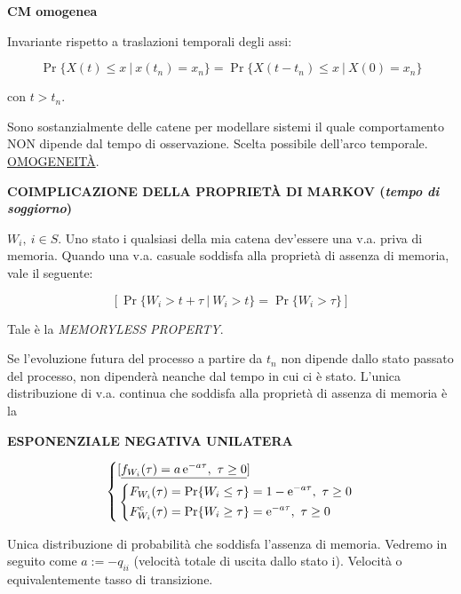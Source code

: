 \begin{defn}{\textbf{CM omogenea}}

Invariante rispetto a traslazioni temporali degli assi:

\[
	\Pr\{X(t) \leq x\ |\ x(t_n) = x_n\} = \Pr\{X(t-t_n) \leq x\ |\ X(0) = x_n\}
\]

con $t > t_n$.
\end{defn}

Sono sostanzialmente delle catene per modellare sistemi il quale comportamento NON dipende dal tempo di osservazione. Scelta possibile dell'arco temporale. \underline{OMOGENEIT\`A}.

\begin{defn}{\textbf{COIMPLICAZIONE DELLA PROPRIET\`A DI MARKOV (\textit{tempo di soggiorno})}}

$W_i,\ i\in S$. Uno stato i qualsiasi della mia catena dev'essere una v.a. priva di memoria. Quando una v.a. casuale soddisfa alla proprietà di assenza di memoria, vale il seguente:

\[
	[\Pr\{W_i > t+\tau\ |\ W_i > t\} = \Pr\{W_i > \tau\}]
\]

Tale è la \textit{MEMORYLESS PROPERTY}.
\end{defn}

Se l'evoluzione futura del processo a partire da $t_n$ non dipende dallo stato passato del processo, non dipenderà neanche dal tempo in cui ci è stato. L'unica distribuzione di v.a. continua che soddisfa alla proprietà di assenza di memoria è la

\begin{defn}{\textbf{ESPONENZIALE NEGATIVA UNILATERA}}

\[
	\left\{
	\begin{aligned}
	&[\underline{f_{W_i}(\tau) = a\mathop{}\!\mathrm{e}^{-a\tau},\ \tau \geq 0}]\\
	&\left\{
	\begin{aligned}
	&F_{W_i}(\tau) = \Pr\{W_i\leq\tau\} = 1-\mathop{}\!\mathrm{e}^{-a\tau},\ \tau\geq 0\\
	&F_{W_i}^c(\tau) = \Pr\{W_i\geq\tau\} = \mathop{}\!\mathrm{e}^{-a\tau},\ \tau\geq 0
	\end{aligned}
	\right.
	\end{aligned}
	\right.
\]

\end{defn}

Unica distribuzione di probabilità che soddisfa l'assenza di memoria. Vedremo in seguito come $a := -q_{ii}$ (velocità totale di uscita dallo stato i). Velocità o equivalentemente tasso di transizione.

